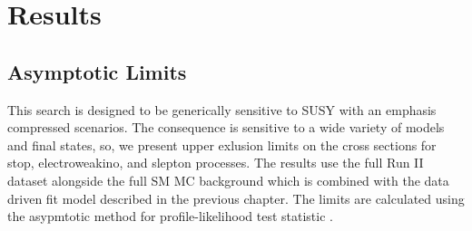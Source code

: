 \setcounter{secnumdepth}{3}
\setcounter{tocdepth}{3}
\setlength{\parskip}{\smallskipamount}
\setlength{\parindent}{0pt}


\makeatletter


\providecommand{\tabularnewline}{\\}


\makeatother


\chapter{Results}


\section{Asymptotic Limits}

This search is designed to be generically sensitive to SUSY with an emphasis compressed scenarios. The consequence is sensitive to a wide variety of models and final states, so, we present upper exlusion limits on the cross sections for stop, electroweakino, and slepton processes. The results use the full Run II dataset alongside the full SM MC background which is combined with the data driven fit model described in the previous chapter. The limits are calculated using the asypmtotic method for profile-likelihood test statistic \cite{Cowan:2010js}.






